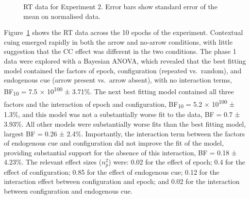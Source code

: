 \documentclass[
  man,
  floatsintext,
  longtable,
  nolmodern,
  notxfonts,
  notimes,
  colorlinks=true,linkcolor=blue,citecolor=blue,urlcolor=blue]{apa7}
\begin{document}
\begin{figure}[H]


\caption{\label{fig-RT-exp2}RT data for Experiment 2. Error bars show
standard error of the mean on normalised data.}

\end{figure}%

Figure~\ref{fig-RT-exp2} shows the RT data across the 10 epochs of the
experiment. Contextual cuing emerged rapidly in both the arrow and
no-arrow conditions, with little suggestion that the CC effect was
different in the two conditions. The phase 1 data were explored with a
Bayesian ANOVA, which revealed that the best fitting model contained the
factors of epoch, configuration (repeated vs.~random), and endogenous
cue (arrow present vs.~arrow absent), with no interaction terms,
BF\textsubscript{10} = 7.5 × 10\textsuperscript{100} ± 3.71\%. The next
best fitting model contained all three factors and the interaction of
epoch and configuration, BF\textsubscript{10} = 5.2 ×
10\textsuperscript{100} ± 1.3\%, and this model was not a substantially
worse fit to the data, BF = 0.7 ± 3.93\%. All other models were
substantially worse fits than the best fitting model, largest BF = 0.26
± 2.4\%. Importantly, the interaction term between the factors of
endogenous cue and configuration did not improve the fit of the model,
providing substantial support for the absence of this interaction, BF =
0.18 ± 4.23\%. The relevant effect sizes (\(n^2_p\)) were: 0.02 for the
effect of epoch; 0.4 for the effect of configuration; 0.85 for the
effect of endogenous cue; 0.12 for the interaction effect between
configuration and epoch; and 0.02 for the interaction between
configuration and endogenous cue.
\end{document}
